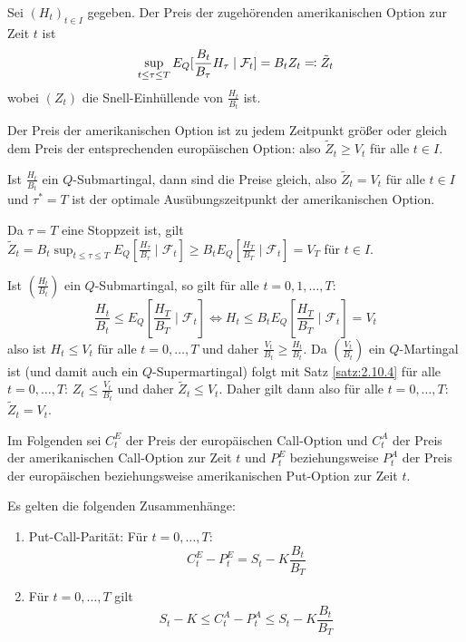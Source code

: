 \documentclass[a4paper,twoside,DIV15,BCOR12mm]{scrbook}
\newcommand{\cF}{\mathcal F}
\begin{document}
Sei $(H_t)_{t\in I}$ gegeben. Der Preis der zugehörenden amerikanischen Option zur Zeit $t$ ist 
\begin{align*}
\sup_{t\le \tau \le T} E_Q [\frac{B_t}{B_\tau}H_\tau \mid \cF_t] = B_t Z_t \ad \tilde Z_t
\end{align*}
wobei $(Z_t)$ die Snell-Einhüllende von $\frac{H_t}{B_t}$ ist.

\begin{satz}
Der Preis der amerikanischen Option ist zu jedem Zeitpunkt größer oder gleich dem Preis der entsprechenden europäischen Option: also $\tilde Z_t \ge V_t$ für alle $t\in I$.

Ist $\frac{H_t}{B_t}$ ein $Q$-Submartingal, dann sind die Preise gleich, also $\tilde Z_t = V_t$ für alle $t\in I$ und $\tau^*=T$ ist der optimale Ausübungszeitpunkt der amerikanischen Option.
\end{satz}

\begin{beweis}
Da $\tau = T$ eine Stoppzeit ist, gilt $\tilde Z_t = B_t \sup_{t\le \tau\le T} E_Q[\frac{H_\tau}{B_\tau} \mid \cF_t] \ge B_t E_Q[\frac{H_T}{B_T}\mid \cF_t] = V_T$ für $t\in I$.

Ist $\left(\frac{H_t}{B_t}\right)$ ein $Q$-Submartingal, so gilt für alle $t=0,1,\ldots,T$: 
\[
\frac{H_t}{B_t} \le E_Q\left[\frac{H_T}{B_T}\mid \cF_t\right] \iff H_t \le B_t E_Q\left[ \frac{H_T}{B_T}\mid \cF_t\right] = V_t
\]
also ist $H_t \le V_t$ für alle $t=0,\ldots,T$ und daher $\frac{V_t}{B_t} \ge \frac{H_t}{B_t}$. Da $\left(\frac{V_t}{B_t}\right)$ ein $Q$-Martingal ist (und damit auch ein $Q$-Supermartingal) folgt mit Satz \ref{satz:2.10.4} für alle $t=0,\ldots,T$: $Z_t \le \frac{V_t}{B_t}$ und daher $\tilde Z_t \le V_t$. Daher gilt dann also für alle $t=0,\ldots,T$: $\tilde Z_t = V_t$.
\end{beweis}

Im Folgenden sei $C_t^E$ der Preis der europäischen Call-Option und $C_t^A$ der Preis der amerikanischen Call-Option zur Zeit $t$ und $P_t^E$ beziehungsweise $P_t^A$ der Preis der europäischen beziehungsweise amerikanischen Put-Option zur Zeit $t$.

\begin{satz}
Es gelten die folgenden Zusammenhänge:
\begin{enumerate}
\item Put-Call-Parität: Für $t=0,\ldots,T$:
\[
C_t^E - P_t^E = S_t - K \frac{B_t}{B_T}
\]
\item Für $t=0,\ldots,T$ gilt
\[
S_t - K \le C_t ^A - P_t^A \le S_t - K\frac{B_t}{B_T}
\]
\end{enumerate}
\end{satz}
\end{document}
